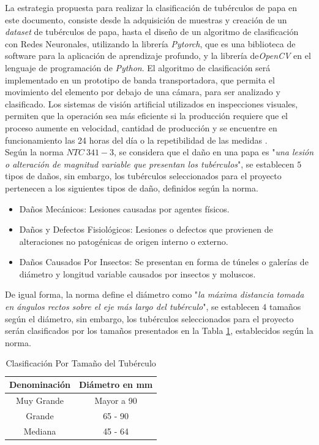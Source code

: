 La estrategia propuesta para realizar la clasificación de tubérculos de papa en este documento, consiste desde la adquisición de muestras y creación de un \textit{dataset} de tubérculos de papa, hasta el diseño de un algoritmo de clasificación con Redes Neuronales, utilizando la librería \textit{Pytorch}, que es una biblioteca de software para la aplicación de aprendizaje profundo, y la librería de\textit{OpenCV} en el lenguaje de programación de \textit{Python}. El algoritmo de clasificación será implementado en un prototipo de banda transportadora, que permita el movimiento del elemento por debajo de una cámara, para ser analizado y clasificado. Los sistemas de visión artificial utilizados en inspecciones visuales, permiten que la operación sea más eficiente si la producción requiere que el proceso aumente en velocidad, cantidad de producción y se encuentre en funcionamiento las 24 horas del día o la repetibilidad de las medidas \cite{artificial2012aplicacion}.\\

Según la norma $NTC \ 341-3$, se considera que el daño en una papa es "\textit{una lesión o alteración de magnitud variable que presentan los tubérculos}", se establecen $5$ tipos de daños, sin embargo, los tubérculos seleccionados para el proyecto pertenecen a los siguientes tipos de daño, definidos según la norma.\\

\begin{itemize}
	\item Daños Mecánicos: Lesiones causadas por agentes físicos.
	\item Daños y Defectos Fisiológicos: Lesiones o defectos que provienen de alteraciones no patogénicas de origen interno o externo.
	\item Daños Causados Por Insectos: Se presentan en forma de túneles o galerías de diámetro y longitud variable causados por insectos y moluscos.
\end{itemize}

De igual forma, la norma define el diámetro como "\textit{la máxima distancia tomada en ángulos rectos sobre el eje más largo del tubérculo}", se establecen $4$ tamaños según el diámetro, sin embargo, los tubérculos seleccionados para el proyecto serán clasificados por los tamaños presentados en la Tabla \ref{tamano}, establecidos según la norma.\\


\begin{table}[ht]
	\centering
	\begin{tabular}{|c|c|}
		\hline
		Denominación & Diámetro en mm \\ \hline
		Muy Grande   & Mayor a 90     \\ \hline
		Grande       & 65 - 90        \\ \hline
		Mediana      & 45 - 64        \\ \hline
	\end{tabular}	
	\caption{Clasificación Por Tamaño del Tubérculo}
	\label{tamano}
\end{table}

